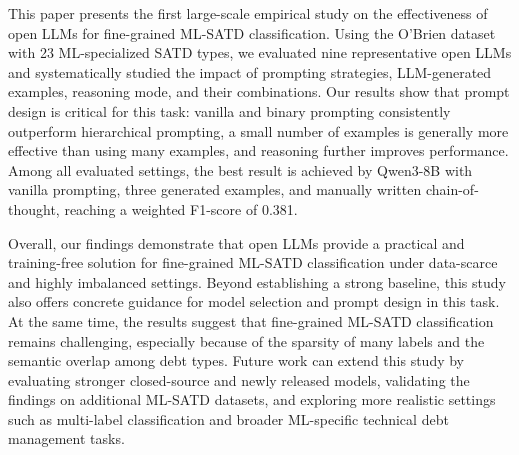 \documentclass[acmsmall,screen,review,anonymous]{acmart}
\begin{document}
This paper presents the first large-scale empirical study on the effectiveness of open LLMs for fine-grained ML-SATD classification. Using the O'Brien dataset with 23 ML-specialized SATD types, we evaluated nine representative open LLMs and systematically studied the impact of prompting strategies, LLM-generated examples, reasoning mode, and their combinations. Our results show that prompt design is critical for this task: vanilla and binary prompting consistently outperform hierarchical prompting, a small number of examples is generally more effective than using many examples, and reasoning further improves performance. Among all evaluated settings, the best result is achieved by Qwen3-8B with vanilla prompting, three generated examples, and manually written chain-of-thought, reaching a weighted F1-score of 0.381.

Overall, our findings demonstrate that open LLMs provide a practical and training-free solution for fine-grained ML-SATD classification under data-scarce and highly imbalanced settings. Beyond establishing a strong baseline, this study also offers concrete guidance for model selection and prompt design in this task. At the same time, the results suggest that fine-grained ML-SATD classification remains challenging, especially because of the sparsity of many labels and the semantic overlap among debt types. Future work can extend this study by evaluating stronger closed-source and newly released models, validating the findings on additional ML-SATD datasets, and exploring more realistic settings such as multi-label classification and broader ML-specific technical debt management tasks.








\appendix

\end{document}
